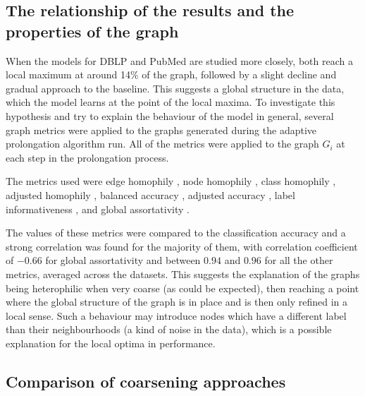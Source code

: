 \subsection{The relationship of the results and the properties of the graph}

When the models for DBLP and PubMed are studied more closely, both reach a local maximum at around 14\% of the graph, followed by a slight decline and gradual approach to the baseline. This suggests a global structure in the data, which the model learns at the point of the local maxima. To investigate this hypothesis and try to explain the behaviour of the model in general, several graph metrics were applied to the graphs generated during the adaptive prolongation algorithm run. All of the metrics were applied to the graph \( G_i \) at each step in the prolongation process.

The metrics used were edge homophily \cite{zhu_beyond_2020}, node homophily \cite{pei_geom-gcn_2020}, class homophily \cite{lim_large_2021}, adjusted homophily \cite{platonov_characterizing_2022}, balanced accuracy \cite{platonov_characterizing_2022}, adjusted accuracy \cite{platonov_characterizing_2022}, label informativeness \cite{platonov_characterizing_2022}, and global assortativity \cite{newman_mixing_2003}.

The values of these metrics were compared to the classification accuracy and a strong correlation was found for the majority of them, with correlation coefficient of \( -0.66 \) for global assortativity and between \( 0.94 \) and \( 0.96 \) for all the other metrics, averaged across the datasets. This suggests the explanation of the graphs being heterophilic when very coarse (as could be expected), then reaching a point where the global structure of the graph is in place and is then only refined in a local sense. Such a behaviour may introduce nodes which have a different label than their neighbourhoods (a kind of noise in the data), which is a possible explanation for the local optima in performance.

\subsection{Comparison of coarsening approaches}

